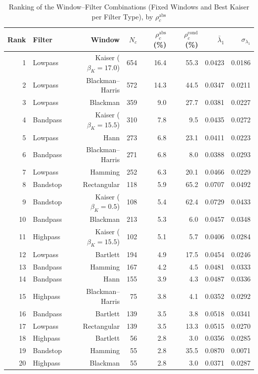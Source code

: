 \documentclass[journal]{IEEEtran}
\begin{document}
\begin{table}[!t]
\caption{Ranking of the Window--Filter Combinations (Fixed Windows and Best Kaiser per Filter Type), by $\rho_c^{\mathrm{abs}}$\label{tab:ranking}}
\centering
\begin{tabular}{rlrrrrrr}
\toprule
Rank & Filter & Window & $N_c$ & $\rho_c^{\mathrm{abs}}$ (\%) & $\rho_c^{\mathrm{cond}}$ (\%) & $\bar{\lambda}_1$ & $\sigma_{\lambda_1}$ \\
\midrule
1 & Lowpass & Kaiser ($\beta_K=17.0$) & 654 & 16.4 & 55.3 & 0.0423 & 0.0186 \\
2 & Lowpass & Blackman--Harris & 572 & 14.3 & 44.5 & 0.0347 & 0.0211 \\
3 & Lowpass & Blackman & 359 & 9.0 & 27.7 & 0.0381 & 0.0227 \\
4 & Bandpass & Kaiser ($\beta_K=15.5$) & 310 & 7.8 & 9.5 & 0.0435 & 0.0272 \\
5 & Lowpass & Hann & 273 & 6.8 & 23.1 & 0.0411 & 0.0223 \\
6 & Bandpass & Blackman--Harris & 271 & 6.8 & 8.0 & 0.0388 & 0.0293 \\
7 & Lowpass & Hamming & 252 & 6.3 & 20.1 & 0.0466 & 0.0229 \\
8 & Bandstop & Rectangular & 118 & 5.9 & 65.2 & 0.0707 & 0.0492 \\
9 & Bandstop & Kaiser ($\beta_K=0.5$) & 108 & 5.4 & 62.4 & 0.0729 & 0.0433 \\
10 & Bandpass & Blackman & 213 & 5.3 & 6.0 & 0.0457 & 0.0348 \\
11 & Highpass & Kaiser ($\beta_K=15.5$) & 102 & 5.1 & 5.7 & 0.0406 & 0.0284 \\
12 & Lowpass & Bartlett & 194 & 4.9 & 17.5 & 0.0454 & 0.0246 \\
13 & Bandpass & Hamming & 167 & 4.2 & 4.5 & 0.0481 & 0.0333 \\
14 & Bandpass & Hann & 155 & 3.9 & 4.3 & 0.0487 & 0.0336 \\
15 & Highpass & Blackman--Harris & 75 & 3.8 & 4.1 & 0.0352 & 0.0292 \\
16 & Bandpass & Bartlett & 139 & 3.5 & 3.8 & 0.0518 & 0.0341 \\
17 & Lowpass & Rectangular & 139 & 3.5 & 13.3 & 0.0515 & 0.0270 \\
18 & Highpass & Bartlett & 56 & 2.8 & 3.0 & 0.0356 & 0.0285 \\
19 & Bandstop & Hamming & 55 & 2.8 & 35.5 & 0.0870 & 0.0071 \\
20 & Highpass & Blackman & 55 & 2.8 & 3.0 & 0.0371 & 0.0287 \\

\end{tabular}
\end{table}
\end{document}
